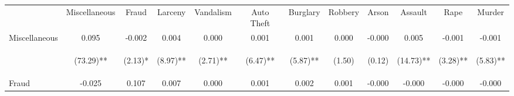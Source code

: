 \begin{tabular}{lccccccccccc}
\hline\hline \noalign{\smallskip} & Miscellaneous & Fraud & Larceny & Vandalism & Auto Theft & Burglary & Robbery & Arson & Assault & Rape & Murder\\
\noalign{\smallskip}\hline \noalign{\smallskip}Miscellaneous & 0.095 & -0.002 & 0.004 & 0.000 & 0.001 & 0.001 & 0.000 & -0.000 & 0.005 & -0.001 & -0.001\\
 & \begin{footnotesize}(73.29)**\end{footnotesize} & \begin{footnotesize}(2.13)*\end{footnotesize} & \begin{footnotesize}(8.97)**\end{footnotesize} & \begin{footnotesize}(2.71)**\end{footnotesize} & \begin{footnotesize}(6.47)**\end{footnotesize} & \begin{footnotesize}(5.87)**\end{footnotesize} & \begin{footnotesize}(1.50)\end{footnotesize} & \begin{footnotesize}(0.12)\end{footnotesize} & \begin{footnotesize}(14.73)**\end{footnotesize} & \begin{footnotesize}(3.28)**\end{footnotesize} & \begin{footnotesize}(5.83)**\end{footnotesize}\\
\noalign{\smallskip}Fraud & -0.025 & 0.107 & 0.007 & 0.000 & 0.001 & 0.002 & 0.001 & -0.000 & -0.000 & -0.000 & -0.000\\

\end{tabular}

